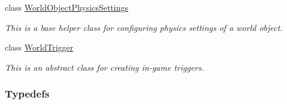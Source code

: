 \begin{DoxyCompactItemize}
class \hyperlink{classMezzanine_1_1WorldObjectPhysicsSettings}{WorldObjectPhysicsSettings}
\begin{DoxyCompactList}\small\item\em This is a base helper class for configuring physics settings of a world object. \item\end{DoxyCompactList}\item 
class \hyperlink{classMezzanine_1_1WorldTrigger}{WorldTrigger}
\begin{DoxyCompactList}\small\item\em This is an abstract class for creating in-\/game triggers. \item\end{DoxyCompactList}\end{DoxyCompactItemize}
\subsubsection*{Typedefs}
